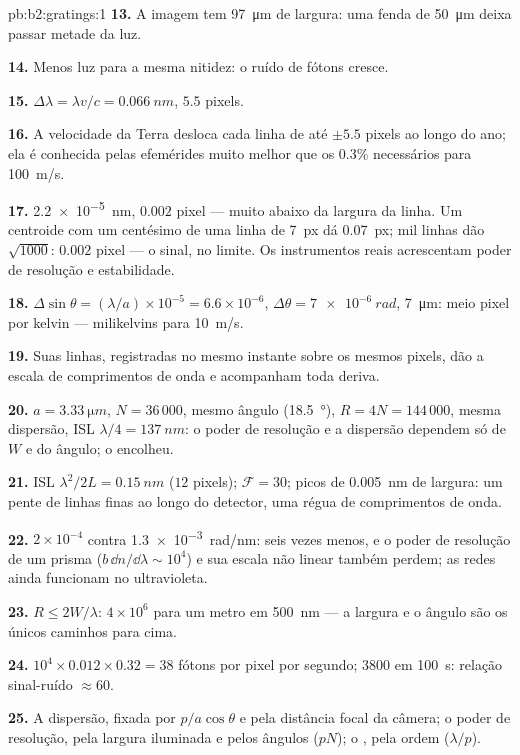 \begin{solution}{pb:b2:gratings:1}
\textbf{13.} A imagem tem \qty{97}{\micro m} de largura: uma fenda de \qty{50}{\micro m} deixa passar
metade da luz.

\textbf{14.} Menos luz para a mesma nitidez: o ruído de fótons cresce.

\textbf{15.} $\Delta\lambda = \lambda v/c = \qty{0.066}{nm}$, $5.5$ pixels.

\textbf{16.} A velocidade da Terra desloca cada linha de até $\pm5.5$
pixels ao longo do ano; ela é conhecida pelas efemérides muito
melhor que os $0.3\%$ necessários para \qty{100}{m/s}.

\textbf{17.} \qty{2.2e-5}{nm}, $0.002$ pixel --- muito abaixo da largura da linha. Um
centroide com um centésimo de uma linha de \qty{7}{px} dá \qty{0.07}{px}; mil
linhas dão $\sqrt{1000}$: $0.002$ pixel --- o sinal, no limite. Os instrumentos
reais acrescentam poder de resolução e estabilidade.

\textbf{18.} $\Delta\sin\theta = (\lambda/a) \times 10^{-5} = 6.6 \times 10^{-6}$, $\Delta\theta = \qty{7e-6}{rad}$,
\qty{7}{\micro m}: meio pixel por kelvin --- milikelvins para \qty{10}{m/s}.

\textbf{19.} Suas linhas, registradas no mesmo instante sobre os mesmos
pixels, dão a escala de comprimentos de onda e acompanham toda deriva.

\textbf{20.} $a = \qty{3.33}{\micro m}$, $N = 36\,000$, mesmo ângulo (\qty{18.5}{\degree}), $R = 4N
= 144\,000$, mesma dispersão, ISL $\lambda/4 = \qty{137}{nm}$: o poder de resolução e a
dispersão dependem só de $W$ e do ângulo; o 
encolheu.

\textbf{21.} ISL $\lambda^2/2L = \qty{0.15}{nm}$ ($12$ pixels); $\mathcal F = 30$; picos de
\qty{0.005}{nm} de largura: um pente de linhas finas ao longo do detector, uma
régua de comprimentos de onda.

\textbf{22.} $2 \times 10^{-4}$ contra \qty{1.3e-3}{rad/nm}: seis vezes menos, e o
poder de resolução de um prisma ($b\,\dd n/\dd\lambda \sim 10^4$) e sua escala não linear
também perdem; as redes ainda funcionam no ultravioleta.

\textbf{23.} $R \le 2W/\lambda$: $4 \times 10^6$ para um metro em \qty{500}{nm} --- a largura e
o ângulo são os únicos caminhos para cima.

\textbf{24.} $10^4 \times 0.012 \times 0.32 = 38$ fótons por pixel por segundo; $3800$
em \qty{100}{s}: relação sinal-ruído $\approx 60$.

\textbf{25.} A dispersão, fixada por $p/a\cos\theta$ e pela distância focal da câmera;
o poder de resolução, pela largura iluminada e pelos ângulos ($pN$);
o , pela ordem ($\lambda/p$).
\end{solution}
